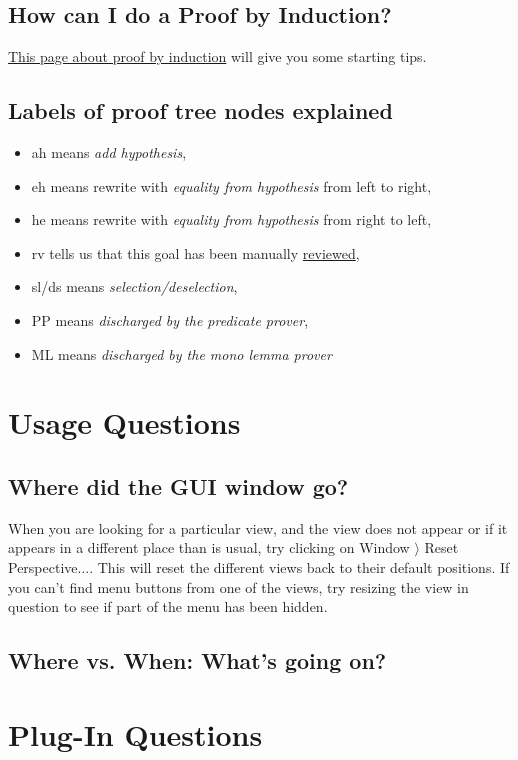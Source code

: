 \subsection{How can I do a Proof by Induction?}

\href{http://wiki.event-b.org/index.php/Induction_proof}{This page about proof by induction} will give you some starting tips.

\subsection{Labels of proof tree nodes explained}

\begin{itemize}
	\item \textsf{ah} means \textit{add hypothesis},
	\item \textsf{eh} means rewrite with \textit{equality from hypothesis} from left to right,
	\item \textsf{he} means rewrite with \textit{equality from hypothesis} from right to left,
	\item \textsf{rv} tells us that this goal has been manually \href{http://wiki.event-b.org/index.php/The_Proving_Perspective_(Rodin_User_Manual)#The_Proof_Control_Window}{reviewed},
	\item \textsf{sl/ds} means \textit{selection/deselection},
	\item \textsf{PP} means \textit{discharged by the predicate prover},
	\item \textsf{ML} means \textit{discharged by the mono lemma prover}
\end{itemize}

\section{Usage Questions}

\subsection{Where did the GUI window go?}

When you are looking for a particular view, and the view does not appear or if it appears in a different place than is usual, try clicking on \textsf{Window $\rangle $ Reset Perspective...}. This will reset the different views back to their default positions. If you can't find menu buttons from one of the views, try resizing the view in question to see if part of the menu has been hidden.

\subsection{Where vs. When: What's going on?}

\section{Plug-In Questions}


